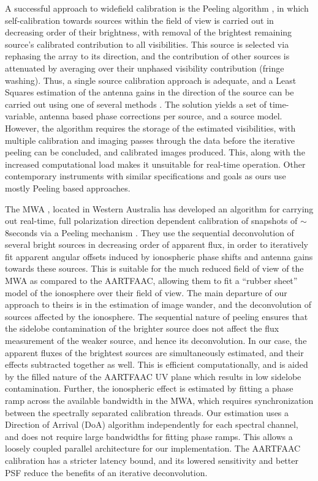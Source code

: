 \documentclass{aa}
\begin{document}
A  successful  approach  to  widefield  calibration  is  the  Peeling  algorithm
\citep{noordam2004peel,vdTol2007selfcallofar}, in which self-calibration towards
sources within  the field of  view is carried  out in decreasing order  of their
brightness,  with  removal  of   the  brightest  remaining  source's  calibrated
contribution  to all  visibilities. This  source is  selected via  rephasing the
array to its  direction, and the contribution of other  sources is attenuated by
averaging over their unphased  visibility contribution (fringe washing). Thus, a
single source calibration  approach is adequate, and a  Least Squares estimation
of the antenna gains in the direction of the source can be carried out using one
of  several methods  \citep{boonstra2003gain}.   The solution  yields  a set  of
time-variable, antenna based  phase corrections per source, and  a source model.
However, the algorithm requires the  storage of the estimated visibilities, with
multiple calibration  and imaging passes  through the data before  the iterative
peeling can be  concluded, and calibrated images produced.  This, along with the
increased computational load makes it unsuitable for real-time operation.  Other
contemporary  instruments with  similar  specifications and  goals  as ours  use
mostly Peeling  based approaches. 

The  MWA   \citep{lonsdale2009murchison},  located  in   Western  Australia  has
developed an  algorithm for carrying out real-time,  full polarization direction
dependent  calibration of snapshots  of $\sim$8seconds  via a  Peeling mechanism
\citep{mitchell2008real}.   They  use the  sequential  deconvolution of  several
bright sources in decreasing order of apparent flux, in order to iteratively fit
apparent angular offsets  induced by ionospheric phase shifts  and antenna gains
towards these  sources. This is suitable for  the much reduced field  of view of
the MWA  as compared to  the AARTFAAC, allowing  them to fit a  ``rubber sheet''
model of  the ionosphere over  their field of  view.  The main departure  of our
approach to theirs  is in the estimation of image  wander, and the deconvolution
of sources affected by the ionosphere.  The sequential nature of peeling ensures
that the sidelobe contamination of the  brighter source does not affect the flux
measurement of the weaker source, and hence its deconvolution.  In our case, the
apparent fluxes of the brightest sources are simultaneously estimated, and their
effects subtracted together as well.   This is efficient computationally, and is
aided  by the  filled  nature of  the AARTFAAC  UV  plane which  results in  low
sidelobe contamination. Further, the  ionospheric effect is estimated by fitting
a  phase  ramp  across  the  available  bandwidth in  the  MWA,  which  requires
synchronization  between  the  spectrally  separated calibration  threads.   Our
estimation uses  a Direction of  Arrival (DoA) algorithm independently  for each
spectral channel, and does not require large bandwidths for fitting phase ramps.
This allows a loosely coupled parallel architecture for our implementation.  The
AARTFAAC calibration has  a stricter latency bound, and  its lowered sensitivity
and better PSF reduce the benefits of  an iterative deconvolution.
\end{document}
